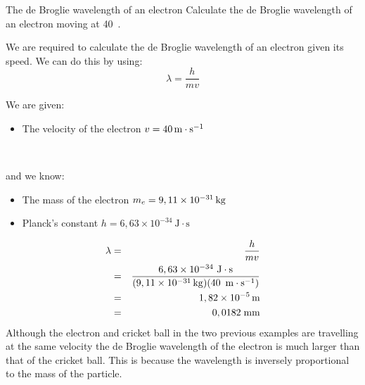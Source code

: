 \begin{wex}{The de Broglie wavelength of an electron}
{Calculate the de Broglie wavelength of an electron moving at 40~\ms.}
{
We are required to calculate the de Broglie wavelength of an electron given its speed. We can do this by using:
$$\lambda=\frac{h}{mv}$$

\begin{minipage}{.8\textwidth}
We are given:
\begin{itemize}
\item The velocity of the electron {$v=40\,\mathrm{m \cdot s^{-1}}$}
\end{itemize}
\end{minipage}\\
\begin{minipage}{.8\textwidth}
and we know:
\begin{itemize}
\item The mass of the electron {$m_{e}=9,11 \times 10^{-31}\,\mathrm{kg}$}
\item Planck's constant {$h=6,63 \times 10^{-34}~\mathrm{J\cdot s}$}
\end{itemize}
\end{minipage}
\begin{eqnarray*}
\lambda&=&\frac{h}{mv}\\
&=&\frac{6,63\times10^{-34}~\mathrm{J\cdot s}}{(9,11 \times 10^{-31}\,\mathrm{kg})(40~\,\mathrm{m \cdot s^{-1}})}\\
& = & 1,82 \times 10^{-5}\,\rm{m}\\
&=&0,0182\;\mathrm{mm}
\end{eqnarray*}
Although the electron and cricket ball in the two previous examples are travelling at the same velocity the de Broglie wavelength of the electron is much larger than that of the cricket ball. This is because the wavelength is inversely proportional to the mass of the particle.
}
\end{wex}

